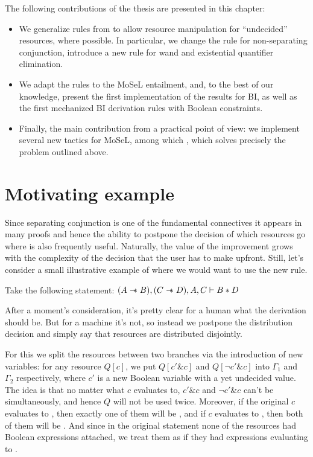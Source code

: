 The following contributions of the thesis are presented in this chapter:
\begin{itemize}
\item We generalize rules from \citet{harlandResourceDistributionBooleanConstraints2003} to allow resource manipulation for ``undecided'' resources, where possible.
  In particular, we change the rule for non-separating conjunction, introduce a new rule for wand and existential quantifier elimination.
\item We adapt the rules to the MoSeL entailment, and, to the best of our knowledge, present the first implementation of the results for BI, as well as the first mechanized BI derivation rules with Boolean constraints.
\item Finally, the main contribution from a practical point of view: we implement several new tactics for MoSeL, among which , which solves precisely the problem outlined above.
\end{itemize}

\section{Motivating example}

Since separating conjunction is one of the fundamental connectives it appears in many proofs and hence the ability to postpone the decision of which resources go where is also frequently useful.
Naturally, the value of the improvement grows with the complexity of the decision that the user has to make upfront.
Still, let's consider a small illustrative example of where we would want to use the new rule.

Take the following statement:
\((A \mathrel{-\mkern-6mu*} B), (C \mathrel{-\mkern-6mu*} D), A, C \vdash B * D\)

After a moment's consideration, it's pretty clear for a human what the derivation should be.
But for a machine it's not, so instead we postpone the distribution decision and simply say that resources are distributed disjointly.

For this we split the resources between two branches via the introduction of new variables:
for any resource \(Q[c]\), we put \(Q[c' \& c]\) and \(Q[\neg c' \& c]\) into \(\Gamma_1\) and \(\Gamma_2\) respectively, where \(c'\) is a new Boolean variable with a yet undecided value.
The idea is that no matter what \(c\) evaluates to, \(c' \& c\) and \(\neg c' \& c\) can't be \true simultaneously, and hence \(Q\) will not be used twice.
Moreover, if the original \(c\) evaluates to \true, then exactly one of them will be \true, and if \(c\) evaluates to \false, then both of them will be \false.
And since in the original statement none of the resources had Boolean expressions attached, we treat them as if they had expressions evaluating to \true.

